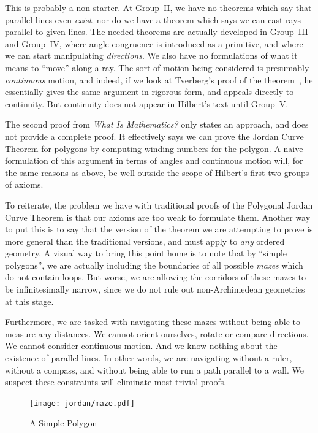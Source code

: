 This is probably a non-starter. At Group~II, we have no theorems which say that parallel lines even \emph{exist}, nor do we have a theorem which says we can cast rays parallel to given lines. The needed theorems are actually developed in Group~III and Group~IV, where angle congruence is introduced as a primitive, and where we can start manipulating \emph{directions}. We also have no formulations of what it means to ``move'' along a ray. The sort of motion being considered is presumably \emph{continuous} motion, and indeed, if we look at Tverberg's proof of the theorem~\cite{TverbergJordan}, he essentially gives the same argument in rigorous form, and appeals directly to continuity. But  continuity does not appear in Hilbert's text until Group~V. 

The second proof from \emph{What Is Mathematics?} only states an approach, and does not provide a complete proof. It effectively says we can prove the Jordan Curve Theorem for polygons by computing winding numbers for the polygon. A naive formulation of this argument in terms of angles and continuous motion will, for the same reasons as above, be well outside the scope of Hilbert's first two groups of axioms. 

To reiterate, the problem we have with traditional proofs of the Polygonal Jordan Curve Theorem is that our axioms are too weak to formulate them. Another way to put this is to say that the version of the theorem we are attempting to prove is more general than the traditional versions, and must apply to \emph{any} ordered geometry. A visual way to bring this point home is to note that by ``simple polygons'', we are actually including the boundaries of all possible \emph{mazes} which do not contain loops. But worse, we are allowing the corridors of these mazes to be infinitesimally narrow, since we do not rule out non-Archimedean geometries at this stage.

Furthermore, we are tasked with navigating these mazes without being able to measure any distances. We cannot orient ourselves, rotate or compare directions. We cannot consider continuous motion. And we know nothing about the existence of parallel lines. In other words, we are navigating without a ruler, without a compass, and without being able to run a path parallel to a wall. We suspect these constraints will eliminate most trivial proofs.

\begin{figure}
\centering
\texttt{[image: jordan/maze.pdf]}
\caption{A Simple Polygon}
\end{figure}

